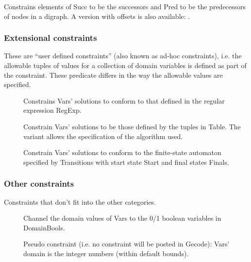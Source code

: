 \begin{description}
\begin{sloppypar}
\item[\biptxtrefni{inverse(+Succ,+Pred)}{inverse/2!gfd}{../bips/lib/gfd/inverse-2.html}]
Constrains elements of Succ to be the successors and
Pred to be the predecessors of nodes in a digraph. A version with offsets
is also available:
.
\end{sloppypar}

\end{description}
 
\subsubsection{Extensional constraints}
These are ``user defined constraints'' (also known as ad-hoc
 constraints), i.e. the allowable tuples of values for a
collection of domain variables is defined as part of the constraint. These
predicate differs in the way the allowable values are specified.

\begin{description}
\item[]
Constrains Vars' solutions to conform to that defined in the regular expression RegExp.

\item[]
Constrain Vars' solutions to be those defined by the tuples in Table.
The variant
allows the specification of the algorithm used.

\item[]
Constrain Vars' solutions to conform to the finite-state 
automaton specified by Transitions with start state Start and  final states Finals.

\end{description}

\subsubsection{Other constraints}

Constraints that don't fit into the other categories.

\begin{description}

\item[]
Channel the domain values of Vars to the 0/1 boolean variables in DomainBools.

\item[]
Pseudo constraint (i.e. no constraint will be posted in Gecode):
Vars' domain is the integer numbers (within default bounds).

\end{description}

